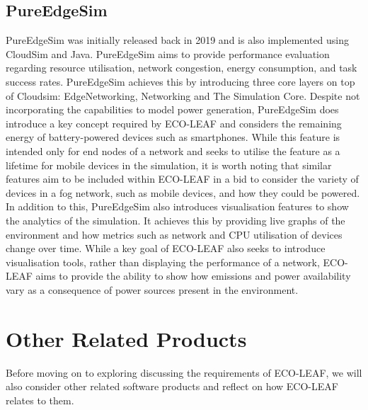 \documentclass{l4proj}
\begin{document}
\subsection{PureEdgeSim}
PureEdgeSim \citep{pureedgesim} was initially released back in 2019 and is also implemented using CloudSim and Java.
PureEdgeSim aims to provide performance evaluation regarding resource utilisation, network congestion, energy consumption, and task success rates.
PureEdgeSim achieves this by introducing three core layers on top of Cloudsim: EdgeNetworking, Networking and The Simulation Core.
Despite not incorporating the capabilities to model power generation, PureEdgeSim does introduce a key concept required by ECO-LEAF and considers the remaining energy of battery-powered devices such as smartphones.
While this feature is intended only for end nodes of a network and seeks to utilise the feature as a lifetime for mobile devices in the simulation, it is worth noting that similar features aim to be included within ECO-LEAF in a bid to consider the variety of devices in a fog network, such as mobile devices, and how they could be powered.
In addition to this, PureEdgeSim also introduces visualisation features to show the analytics of the simulation.
It achieves this by providing live graphs of the environment and how metrics such as network and CPU utilisation of devices change over time.
While a key goal of ECO-LEAF also seeks to introduce visualisation tools, rather than displaying the performance of a network, ECO-LEAF aims to provide the ability to show how emissions and power availability vary as a consequence of power sources present in the environment.

\section{Other Related Products}
Before moving on to exploring discussing the requirements of ECO-LEAF, we will also consider other related software products and reflect on how ECO-LEAF relates to them.
\end{document}
